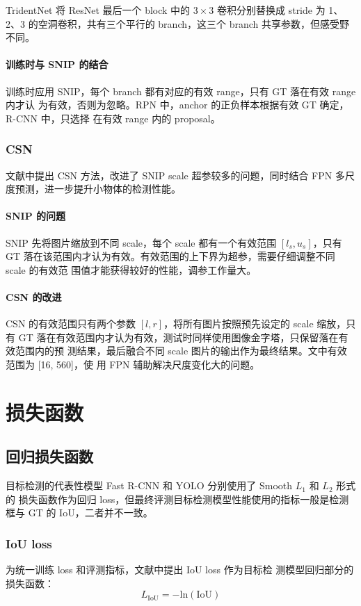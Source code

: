 TridentNet 将 ResNet 最后一个 block 中的 $3 \times 3$ 卷积分别替换成 stride 为
1、2、3 的空洞卷积，共有三个平行的 branch，这三个 branch 共享参数，但感受野不同。

\paragraph{训练时与 SNIP 的结合}
训练时应用 SNIP，每个 branch 都有对应的有效 range，只有 GT 落在有效 range 内才认
为有效，否则为忽略。RPN 中，anchor 的正负样本根据有效 GT 确定，R-CNN 中，只选择
在有效 range 内的 proposal。

\subsubsection{CSN}
文献中提出 CSN 方法，改进了 SNIP scale 超参较多的问题，同时结合
FPN 多尺度预测，进一步提升小物体的检测性能。 

\paragraph{SNIP 的问题}
SNIP 先将图片缩放到不同 scale，每个 scale 都有一个有效范围 $[l_s, u_s]$，只有 GT
落在该范围内才认为有效。有效范围的上下界为超参，需要仔细调整不同 scale 的有效范
围值才能获得较好的性能，调参工作量大。

\paragraph{CSN 的改进}
CSN 的有效范围只有两个参数 $[l, r]$，将所有图片按照预先设定的 scale 缩放，只有
GT 落在有效范围内才认为有效，测试时同样使用图像金字塔，只保留落在有效范围内的预
测结果，最后融合不同 scale 图片的输出作为最终结果。文中有效范围为 [16, 560]，使
用 FPN 辅助解决尺度变化大的问题。

\section{损失函数}
\subsection{回归损失函数}
目标检测的代表性模型 Fast R-CNN 和 YOLO 分别使用了 Smooth $L_1$ 和 $L_2$ 形式的
损失函数作为回归 loss，但最终评测目标检测模型性能使用的指标一般是检测框与 GT 的
IoU，二者并不一致。

\subsubsection{IoU loss}
为统一训练 loss 和评测指标，文献中提出 IoU loss 作为目标检
测模型回归部分的损失函数：
\begin{equation}
  L_{\mathrm{IoU}} = - \mathrm{ln} (\mathrm{IoU})
\end{equation}

